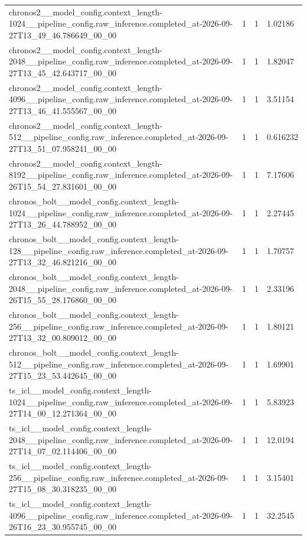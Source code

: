 \begin{tabular}{llll}
chronos2\_\_model\_config.context\_length-1024\_\_pipeline\_config.raw\_inference.completed\_at-2026-09-27T13\_49\_46.786649\_00\_00 & 1 & 1 & 1.02186 \\
chronos2\_\_model\_config.context\_length-2048\_\_pipeline\_config.raw\_inference.completed\_at-2026-09-27T13\_45\_42.643717\_00\_00 & 1 & 1 & 1.82047 \\
chronos2\_\_model\_config.context\_length-4096\_\_pipeline\_config.raw\_inference.completed\_at-2026-09-27T13\_46\_41.555567\_00\_00 & 1 & 1 & 3.51154 \\
chronos2\_\_model\_config.context\_length-512\_\_pipeline\_config.raw\_inference.completed\_at-2026-09-27T13\_51\_07.958241\_00\_00 & 1 & 1 & 0.616232 \\
chronos2\_\_model\_config.context\_length-8192\_\_pipeline\_config.raw\_inference.completed\_at-2026-09-26T15\_54\_27.831601\_00\_00 & 1 & 1 & 7.17606 \\
chronos\_bolt\_\_model\_config.context\_length-1024\_\_pipeline\_config.raw\_inference.completed\_at-2026-09-27T13\_26\_44.788952\_00\_00 & 1 & 1 & 2.27445 \\
chronos\_bolt\_\_model\_config.context\_length-128\_\_pipeline\_config.raw\_inference.completed\_at-2026-09-27T13\_32\_46.821216\_00\_00 & 1 & 1 & 1.70757 \\
chronos\_bolt\_\_model\_config.context\_length-2048\_\_pipeline\_config.raw\_inference.completed\_at-2026-09-26T15\_55\_28.176860\_00\_00 & 1 & 1 & 2.33196 \\
chronos\_bolt\_\_model\_config.context\_length-256\_\_pipeline\_config.raw\_inference.completed\_at-2026-09-27T13\_32\_00.809012\_00\_00 & 1 & 1 & 1.80121 \\
chronos\_bolt\_\_model\_config.context\_length-512\_\_pipeline\_config.raw\_inference.completed\_at-2026-09-27T15\_23\_53.442645\_00\_00 & 1 & 1 & 1.69901 \\
ts\_icl\_\_model\_config.context\_length-1024\_\_pipeline\_config.raw\_inference.completed\_at-2026-09-27T14\_00\_12.271364\_00\_00 & 1 & 1 & 5.83923 \\
ts\_icl\_\_model\_config.context\_length-2048\_\_pipeline\_config.raw\_inference.completed\_at-2026-09-27T14\_07\_02.114406\_00\_00 & 1 & 1 & 12.0194 \\
ts\_icl\_\_model\_config.context\_length-256\_\_pipeline\_config.raw\_inference.completed\_at-2026-09-27T15\_08\_30.318235\_00\_00 & 1 & 1 & 3.15401 \\
ts\_icl\_\_model\_config.context\_length-4096\_\_pipeline\_config.raw\_inference.completed\_at-2026-09-26T16\_23\_30.955745\_00\_00 & 1 & 1 & 32.2545 \\

\end{tabular}
